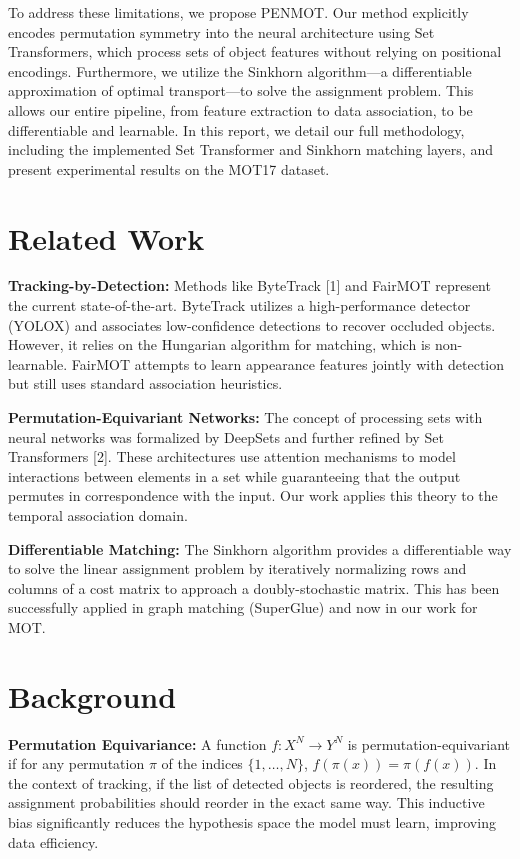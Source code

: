 \documentclass{article}
\begin{document}
To address these limitations, we propose PENMOT. Our method explicitly encodes permutation symmetry into the neural architecture using Set Transformers, which process sets of object features without relying on positional encodings. Furthermore, we utilize the Sinkhorn algorithm—a differentiable approximation of optimal transport—to solve the assignment problem. This allows our entire pipeline, from feature extraction to data association, to be differentiable and learnable. In this report, we detail our full methodology, including the implemented Set Transformer and Sinkhorn matching layers, and present experimental results on the MOT17 dataset.

\section{Related Work}

\textbf{Tracking-by-Detection:} Methods like ByteTrack [1] and FairMOT represent the current state-of-the-art. ByteTrack utilizes a high-performance detector (YOLOX) and associates low-confidence detections to recover occluded objects. However, it relies on the Hungarian algorithm for matching, which is non-learnable. FairMOT attempts to learn appearance features jointly with detection but still uses standard association heuristics.

\textbf{Permutation-Equivariant Networks:} The concept of processing sets with neural networks was formalized by DeepSets and further refined by Set Transformers [2]. These architectures use attention mechanisms to model interactions between elements in a set while guaranteeing that the output permutes in correspondence with the input. Our work applies this theory to the temporal association domain.

\textbf{Differentiable Matching:} The Sinkhorn algorithm provides a differentiable way to solve the linear assignment problem by iteratively normalizing rows and columns of a cost matrix to approach a doubly-stochastic matrix. This has been successfully applied in graph matching (SuperGlue) and now in our work for MOT.

\section{Background}

\textbf{Permutation Equivariance:} A function $f: X^N \rightarrow Y^N$ is permutation-equivariant if for any permutation $\pi$ of the indices $\{1, \dots, N\}$, $f(\pi(x)) = \pi(f(x))$. In the context of tracking, if the list of detected objects is reordered, the resulting assignment probabilities should reorder in the exact same way. This inductive bias significantly reduces the hypothesis space the model must learn, improving data efficiency.
\end{document}
